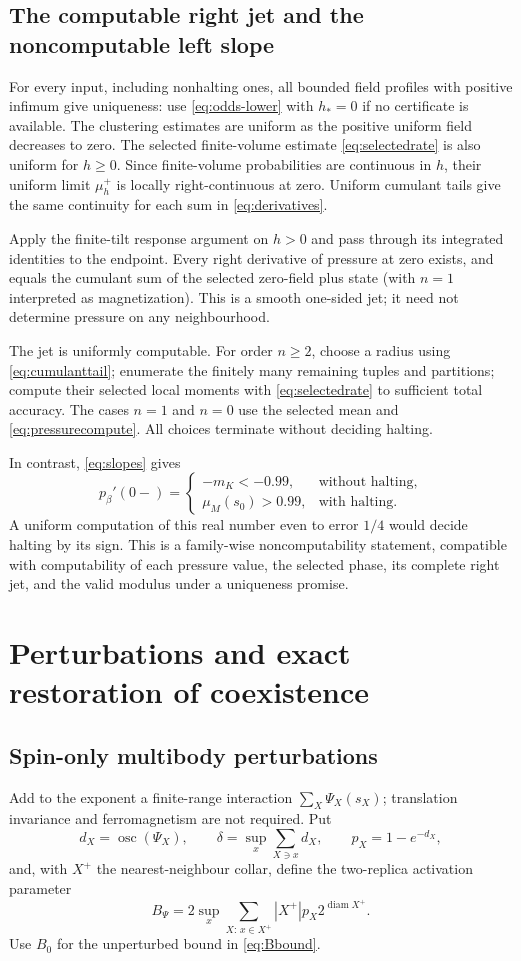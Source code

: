 \documentclass[11pt,reqno]{amsart}
\numberwithin{equation}{section}
\theoremstyle{definition}
\theoremstyle{remark}
\newcommand{\osc}{\operatorname{osc}}
\newcommand{\diam}{\operatorname{diam}}
\begin{document}
\subsection{The computable right jet and the noncomputable left slope}
For every input, including nonhalting ones, all bounded field profiles with positive infimum give uniqueness: use \eqref{eq:odds-lower} with $h_*=0$ if no certificate is available. The clustering estimates are uniform as the positive uniform field decreases to zero. The selected finite-volume estimate \eqref{eq:selectedrate} is also uniform for $h\geq0$. Since finite-volume probabilities are continuous in $h$, their uniform limit $\mu_h^+$ is locally right-continuous at zero. Uniform cumulant tails give the same continuity for each sum in \eqref{eq:derivatives}.

Apply the finite-tilt response argument on $h>0$ and pass through its integrated identities to the endpoint. Every right derivative of pressure at zero exists, and equals the cumulant sum of the selected zero-field plus state (with $n=1$ interpreted as magnetization). This is a smooth one-sided jet; it need not determine pressure on any neighbourhood.

The jet is uniformly computable. For order $n\geq2$, choose a radius using \eqref{eq:cumulanttail}; enumerate the finitely many remaining tuples and partitions; compute their selected local moments with \eqref{eq:selectedrate} to sufficient total accuracy. The cases $n=1$ and $n=0$ use the selected mean and \eqref{eq:pressurecompute}. All choices terminate without deciding halting.

In contrast, \eqref{eq:slopes} gives
\[
 p_\beta'(0-)=\begin{cases}
  -m_K<-0.99,&\text{without halting},\\
  \mu_M(s_0)>0.99,&\text{with halting}.
 \end{cases}
\]
A uniform computation of this real number even to error $1/4$ would decide halting by its sign. This is a family-wise noncomputability statement, compatible with computability of each pressure value, the selected phase, its complete right jet, and the valid modulus under a uniqueness promise.


\section{Perturbations and exact restoration of coexistence}\label{sec:stability}

\subsection{Spin-only multibody perturbations}
Add to the exponent a finite-range interaction $\sum_X\Psi_X(s_X)$; translation invariance and ferromagnetism are not required. Put
\[
 d_X=\osc(\Psi_X),\qquad
 \delta=\sup_x\sum_{X\ni x}d_X,\qquad
 p_X=1-e^{-d_X},
\]
and, with $X^+$ the nearest-neighbour collar, define the two-replica activation parameter
\begin{equation}\label{eq:Bpsi}
 B_\Psi=2\sup_x\sum_{X:\,x\in X^+}|X^+|p_X2^{\diam X^+}.
\end{equation}
Use $B_0$ for the unperturbed bound in \eqref{eq:Bbound}.
\end{document}
